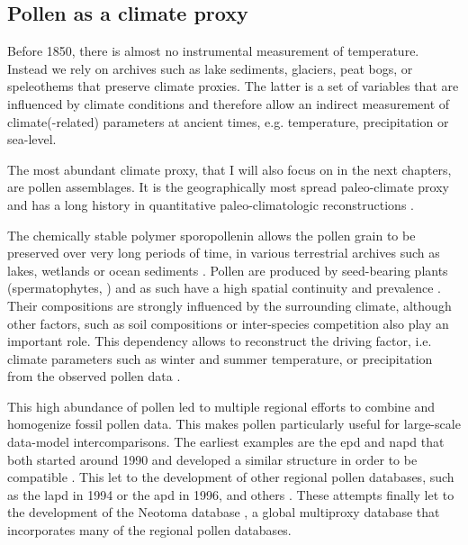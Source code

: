 \begin{refsection}
\subsection{Pollen as a climate proxy}  \label{sec:intro-paleo-data}
Before 1850, there is almost no instrumental measurement of temperature. Instead we rely on archives such as lake sediments, glaciers, peat bogs, or speleothems that preserve climate proxies. The latter is a set of variables that are influenced by climate conditions and therefore allow an indirect measurement of climate(-related) parameters at ancient times, e.g. temperature, precipitation or sea-level. 

The most abundant climate proxy, that I will also focus on in the next chapters, are pollen assemblages. It is the  geographically most spread paleo-climate proxy \citep{BirksBirks1980} and has a long history in quantitative paleo-climatologic reconstructions \citep[e.g.][]{Nichols1967, Nichols1969, Bradley1985, Iversen1944}.

The chemically stable polymer sporopollenin allows the pollen grain to be preserved over very long periods of time, in various terrestrial archives such as lakes, wetlands or ocean sediments \citep{FaegriKalandKrzywinski1989, Havinga1967}. Pollen are produced by seed-bearing plants (spermatophytes, \cite{Wodehouse1935}) and as such have a high spatial continuity and prevalence \citep{ChevalierDavisGajewskiEtAlinprep}. Their compositions are strongly influenced by the surrounding climate, although other factors, such as soil compositions or inter-species competition also play an important role. This dependency allows to reconstruct the driving factor, i.e. climate parameters such as winter and summer temperature, or precipitation from the observed pollen data \citep{JugginsBirks2012,Juggins2013,BrewerGuiotBarboni2007, ChevalierDavisGajewskiEtAlinprep}.

This high abundance of pollen led to multiple regional efforts to combine and homogenize fossil pollen data. This makes pollen particularly useful for large-scale data-model intercomparisons. The earliest examples are the \gls{epd} and \gls{napd}  that both started around 1990 and developed a similar structure in order to be compatible \citep{Grimm2008, FyfeBeaulieuBinneyEtAl2009} . This let to the development of other regional pollen databases, such as the \gls{lapd} \citep{FlantuaHooghiemstraGrimmEtAl2015, MarchantAlmeidaBehlingEtAl2002} in 1994 or the \gls{apd} \citep{VincensLezineBuchetEtAl2007} in 1996, and others \citep[see][]{Grimm2008}. These attempts finally let to the development of the Neotoma database \citep{WilliamsGrimmBloisEtAl2018}, a global multiproxy database that incorporates many of the regional pollen databases.


\end{refsection}
